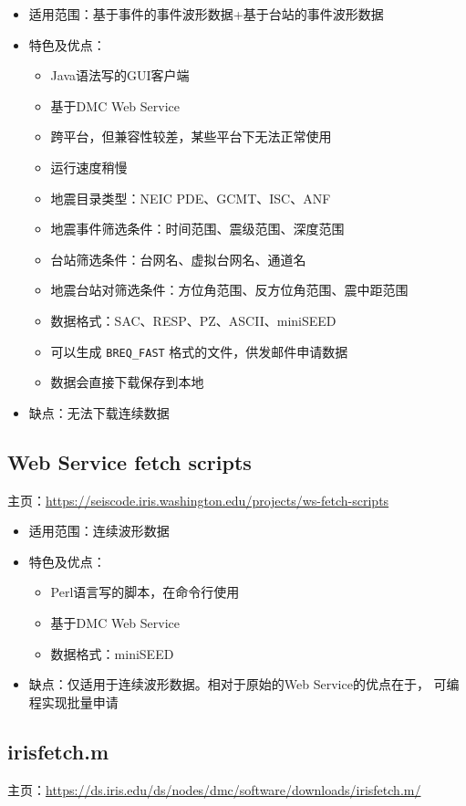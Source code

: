 \begin{itemize}
\item 适用范围：基于事件的事件波形数据+基于台站的事件波形数据
\item 特色及优点：
    \begin{itemize}
    \item Java语法写的GUI客户端
    \item 基于DMC Web Service
    \item 跨平台，但兼容性较差，某些平台下无法正常使用
    \item 运行速度稍慢
    \item 地震目录类型：NEIC PDE、GCMT、ISC、ANF
    \item 地震事件筛选条件：时间范围、震级范围、深度范围
    \item 台站筛选条件：台网名、虚拟台网名、通道名
    \item 地震台站对筛选条件：方位角范围、反方位角范围、震中距范围
    \item 数据格式：SAC、RESP、PZ、ASCII、miniSEED
    \item 可以生成 \verb|BREQ_FAST| 格式的文件，供发邮件申请数据
    \item 数据会直接下载保存到本地
    \end{itemize}
\item 缺点：无法下载连续数据
\end{itemize}

\subsection{Web Service fetch scripts}
主页：\url{https://seiscode.iris.washington.edu/projects/ws-fetch-scripts}

\begin{itemize}
\item 适用范围：连续波形数据
\item 特色及优点：
    \begin{itemize}
    \item Perl语言写的脚本，在命令行使用
    \item 基于DMC Web Service
    \item 数据格式：miniSEED
    \end{itemize}
\item 缺点：仅适用于连续波形数据。相对于原始的Web Service的优点在于，
    可编程实现批量申请
\end{itemize}

\subsection{irisfetch.m}
主页：\url{https://ds.iris.edu/ds/nodes/dmc/software/downloads/irisfetch.m/}

